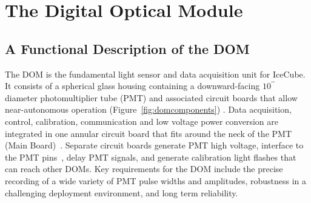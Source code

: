 
\newcommand{\degC}[1]{$\unit[#1]{^\circ{C}}$}
\def\lsim{\mathrel{\rlap{\raise 0.2ex\hbox{$\,<\,$}}{\lower 0.9ex\hbox{$\,\sim\,$}}}}
\def\gsim{\mathrel{\rlap{\raise 0.2ex\hbox{$\,>\,$}}{\lower 0.9ex\hbox{$\,\sim\,$}}}}


\section{\label{sec:dom}The Digital Optical Module}

\subsection{\label{sec:dom_functional} A Functional Description of the DOM}

The DOM is the fundamental light sensor and data acquisition unit for IceCube.
It consists of a spherical glass housing 
containing a downward-facing $10^{\prime\prime}$ diameter photomultiplier tube (PMT)
and associated circuit boards that allow near-autonomous operation (Figure~\ref{fig:domcomponents}) .
Data acquisition, control, calibration, communication and low voltage power conversion 
are integrated in one annular circuit board that fits around the neck of the PMT (Main Board)~\cite{ref:domdaq}. 
Separate circuit boards generate PMT high voltage, interface to the PMT pins~\cite{ref:pmt},
delay PMT signals, and generate calibration light flashes that can reach other DOMs.
Key requirements for the DOM include
the precise recording of a wide variety of PMT pulse widths and amplitudes, robustness in
a challenging deployment environment, and long term reliability.

